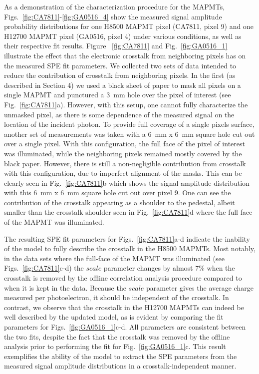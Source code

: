 As a demonstration of the characterization procedure for the MAPMTs, Figs.~\ref{fig:CA7811}-\ref{fig:GA0516_4} show the measured signal amplitude probability distributions for one H8500 MAPMT pixel (CA7811, pixel 9) and one H12700 MAPMT pixel (GA0516, pixel 4) under various conditions, as well as their respective fit results. 
Figure ~\ref{fig:CA7811} and Fig.~\ref{fig:GA0516_1} illustrate the effect that the electronic crosstalk from neighboring pixels has on the measured SPE fit parameters. 
We collected two sets of data intended to reduce the contribution of crosstalk from neighboring pixels. In the first (as described in Section 4) we used a black sheet of paper to mask all pixels on a single MAPMT and punctured a 3~mm hole over the pixel of interest (see Fig.~\ref{fig:CA7811}a). 
However, with this setup, one cannot fully characterize the unmasked pixel, as there is some dependence of the measured signal on the location of the incident photon. 
To provide full coverage of a single pixel\textquotesingle s surface, another set of measurements was taken with a 6~mm x 6~mm square hole cut out over a single pixel. 
With this configuration, the full face of the pixel of interest was illuminated, while the neighboring pixels remained mostly covered by the black paper. 
However, there is still a non-negligible contribution from crosstalk with this configuration, due to imperfect alignment of the masks. 
This can be clearly seen in Fig.~\ref{fig:CA7811}b which shows the signal amplitude distribution with this 6~mm x 6~mm square hole cut out over pixel 9. 
One can see the contribution of the crosstalk appearing as a shoulder to the pedestal, albeit smaller than the crosstalk shoulder seen in Fig.~\ref{fig:CA7811}d where the full face of the MAPMT was illuminated. 

The resulting SPE fit parameters for Figs.~\ref{fig:CA7811}a-d indicate the inability of the model to fully describe the crosstalk in the H8500 MAPMTs. 
Most notably, in the data sets where the full-face of the MAPMT was illuminated (see Figs.~\ref{fig:CA7811}c-d) the $scale$ parameter changes by almost $7\%$ when the crosstalk is removed by the offline correlation analysis procedure compared to when it is kept in the data. 
Because the $scale$ parameter gives the average charge measured per photoelectron, it should be independent of the crosstalk. 
In contrast, we observe that the crosstalk in the H12700 MAPMTs can indeed be well described by the updated model, as is evident by comparing the fit parameters for Figs.~\ref{fig:GA0516_1}c-d. 
All parameters are consistent between the two fits, despite the fact that the crosstalk was removed by the offline analysis prior to performing the fit for Fig.~\ref{fig:GA0516_1}c. 
This result exemplifies the ability of the model to extract the SPE parameters from the measured signal amplitude distributions in a crosstalk-independent manner. 


